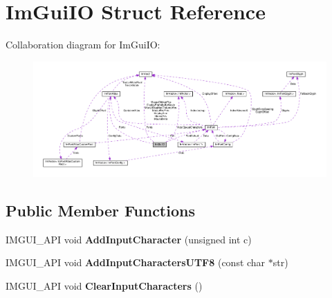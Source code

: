 \hypertarget{structImGuiIO}{}\section{Im\+Gui\+IO Struct Reference}
\label{structImGuiIO}


Collaboration diagram for Im\+Gui\+IO\+:\nopagebreak
\begin{figure}[H]
\begin{center}
\leavevmode
\includegraphics[width=350pt]{structImGuiIO__coll__graph}
\end{center}
\end{figure}
\subsection*{Public Member Functions}
\begin{DoxyCompactItemize}
\item 
\mbox{\label{structImGuiIO_a0ded7ab1043ea14b65e1d81819878ccc}} 
I\+M\+G\+U\+I\+\_\+\+A\+PI void {\bfseries Add\+Input\+Character} (unsigned int c)
\item 
\mbox{\label{structImGuiIO_abf60d6dc365fab19136059f64680bdcc}} 
I\+M\+G\+U\+I\+\_\+\+A\+PI void {\bfseries Add\+Input\+Characters\+U\+T\+F8} (const char $\ast$str)
\item 
\mbox{\label{structImGuiIO_a82d8794e14e628efbb026af4202c70ca}} 
I\+M\+G\+U\+I\+\_\+\+A\+PI void {\bfseries Clear\+Input\+Characters} ()
\end{DoxyCompactItemize}
